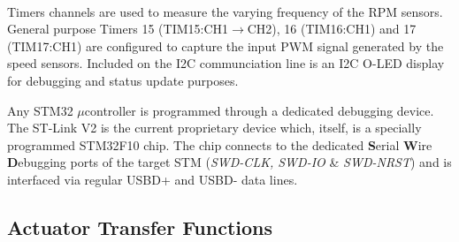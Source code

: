 \\
Timers channels are used to measure the varying frequency of the RPM sensors. General purpose Timers 15 (TIM15:CH1$\rightarrow$CH2), 16 (TIM16:CH1) and 17 (TIM17:CH1) are configured to capture the input PWM signal generated by the speed sensors. Included on the I2C communciation line is an I2C O-LED display for debugging and status update purposes.
\par
Any STM32 $\mu$controller is programmed through a dedicated debugging device. The ST-Link V2\cite{st-link} is the current proprietary device which, itself, is a specially programmed STM32F10 chip. The chip connects to the dedicated \textbf{S}erial \textbf{W}ire \textbf{D}ebugging ports of the target STM (\emph{SWD-CLK, SWD-IO} \& \emph{SWD-NRST}) and is interfaced via regular USBD+ and USBD- data lines. 
\subsection{Actuator Transfer Functions}
\label{subsec:proto.design.transfer}
